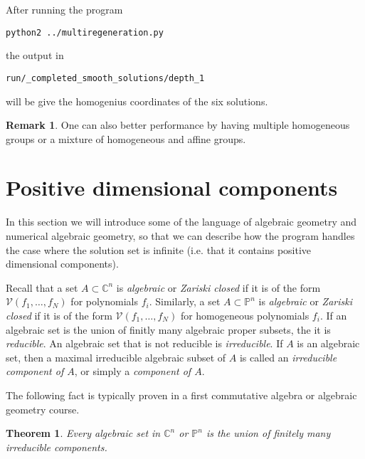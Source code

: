 \documentclass[12pt]{article}
\newtheorem{theorem}{Theorem}[section]
\theoremstyle{definition}
\newtheorem{remark}{Remark}[section]
\newcommand{\C}{\mathbb{C}}
\newcommand{\PP}{\mathbb{P}}
\begin{document}
\noindent After running the program
\begin{leftbar}
\vspace{-10pt} 
\begin{verbatim}
python2 ../multiregeneration.py
\end{verbatim}\vspace{-10pt} 
\end{leftbar}
\noindent the output in
\begin{leftbar}
\vspace{-10pt} 
\begin{verbatim}
run/_completed_smooth_solutions/depth_1
\end{verbatim}\vspace{-10pt} 
\end{leftbar}
\noindent will be give the homogenius coordinates of the six 
solutions.

\begin{remark}
One can also better performance by having multiple homogeneous groups or a mixture of homogeneous and affine groups. 
\end{remark}

\section{Positive dimensional components}
In this section we will introduce some of the language of 
algebraic geometry and numerical algebraic geometry, so that we can 
describe how the program handles the case where the solution set is 
infinite (i.e. that it contains positive dimensional components).

Recall that a set $A \subset \C^n$ is \emph{algebraic} or \emph{Zariski 
closed} if it is of the form $\mathcal{V}(f_1, \ldots, f_N)$ for 
polynomials $f_i$. Similarly, a set $A \subset \PP^n$ is 
\emph{algebraic} or \emph{Zariski closed} if it is of the form 
$\mathcal{V}(f_1, \ldots, f_N)$ for 
homogeneous polynomials $f_i$. If an algebraic set is the union of 
finitly many algebraic proper subsets, the it is \emph{reducible}. An 
algebraic set that is not reducible is \emph{irreducible}. If $A$ is an 
algebraic set, then a maximal irreducible algebraic subset of $A$ 
is called an \emph{irreducible component of $A$}, or simply a 
\emph{component of $A$}.

The following fact is typically proven in a first commutative algebra or 
algebraic geometry course.
\begin{theorem}
   Every algebraic set in $\C^n$ or $\PP^n$ is the union of finitely 
   many irreducible components.
\end{theorem}
\end{document}
